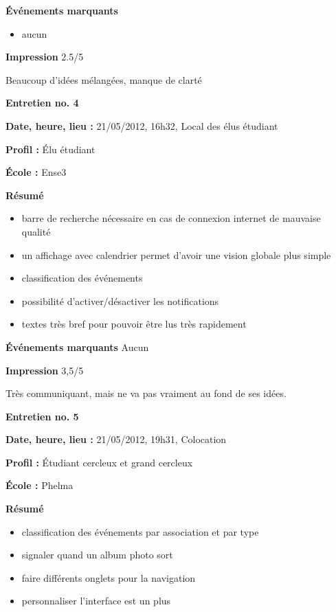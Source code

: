\documentclass[a4paper, 11px]{article}
\begin{document}
\vspace{.25cm}
\textbf{Événements marquants}
	\begin{itemize}
		\item aucun
	\end{itemize}

\vspace{.25cm}
\textbf{Impression} 2.5/5 

Beaucoup d'idées mélangées, manque de clarté



\vspace{.3cm}

 \textbf {\large Entretien no. 4}

\textbf{Date, heure, lieu : }
21/05/2012, 16h32, Local des élus étudiant

\textbf{Profil : }
Élu étudiant

\textbf{École : }
Ense3

\textbf{Résumé}
	\begin{itemize}
		\item barre de recherche nécessaire en cas de connexion internet de mauvaise qualité
		\item un affichage avec calendrier permet d'avoir une vision globale plus simple
		\item classification des événements
		\item possibilité d'activer/désactiver les notifications
		\item textes très bref pour pouvoir être lus très rapidement
	\end{itemize}
\vspace{.25cm}

\textbf{Événements marquants}
Aucun


\textbf{Impression} 3,5/5

Très communiquant, mais ne va pas vraiment au fond de ses idées.



\vspace{.3cm}

 \textbf {\large Entretien no. 5}

\textbf{Date, heure, lieu : }
21/05/2012, 19h31, Colocation

\textbf{Profil : }
Étudiant cercleux et grand cercleux


\textbf{École : }
Phelma

\textbf{Résumé}
	\begin{itemize}
		\item classification des événements par association et par type
		\item signaler quand un album photo sort
		\item faire différents onglets pour la navigation
		\item personnaliser l'interface est un plus
	\end{itemize}
\vspace{.25cm}
\end{document}
